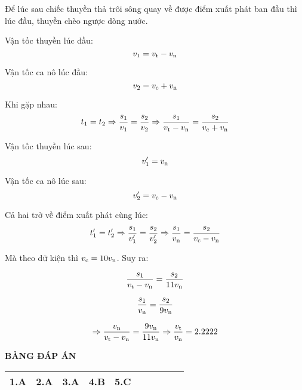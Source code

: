 \begin{enumerate}[label=\bfseries Câu \arabic*:]
{	Để lúc sau chiếc thuyền thả trôi sông quay về được điểm xuất phát ban đầu thì lúc đầu, thuyền chèo ngược dòng nước.
	
	Vận tốc thuyền lúc đầu:
	$$v_1=v_\text t - v_\text n$$
	
	Vận tốc ca nô lúc đầu:
	$$v_2 = v_\text c + v_\text n$$
	
	Khi gặp nhau:
	$$t_1 = t_2 \Rightarrow \dfrac{s_1}{v_1} = \dfrac{s_2}{v_2} \Rightarrow \dfrac{s_1}{v_\text t - v_\text n} = \dfrac{s_2}{v_\text c + v_\text n}$$
	
	Vận tốc thuyền lúc sau:
	$$v_1' = v_\text n$$
	
	Vận tốc ca nô lúc sau:
	$$v_2' = v_\text c - v_\text n$$
	
	Cả hai trở về điểm xuất phát cùng lúc:
	$$t_1' = t_2' \Rightarrow \dfrac{s_1}{v_1'} = \dfrac{s_2}{v_2'} \Rightarrow \dfrac{s_1}{v_\text n} = \dfrac{s_2}{v_\text c - v_\text n}$$
	
	Mà theo dữ kiện thì $v_\text c = 10 v_\text n$. Suy ra:
	
	$$\dfrac{s_1}{v_\text t - v_\text n} = \dfrac{s_2}{11 v_\text n}$$
	
	$$\dfrac{s_1}{v_\text n} = \dfrac{s_2}{9 v_\text n}$$
	
	$$\Rightarrow \dfrac{v_\text n}{v_\text t - v_\text n} = \dfrac{9 v_\text n}{11 v_\text n} \Rightarrow \dfrac{v_\text t}{v_\text n} = \SI{2.2222}{}$$
	}
\end{enumerate}

\whiteBGstarEnd

\loigiai
{
	\begin{center}
		\textbf{BẢNG ĐÁP ÁN}
	\end{center}
	\begin{center}
		\begin{tabular}{|m{2.8em}|m{2.8em}|m{2.8em}|m{2.8em}|m{2.8em}|m{2.8em}|m{2.8em}|m{2.8em}|m{2.8em}|m{2.8em}|}
			\hline
			1.A  & 2.A  & 3.A  & 4.B  & 5.C  & & & &  &   \\
			\hline
			
		\end{tabular}
	\end{center}
}
